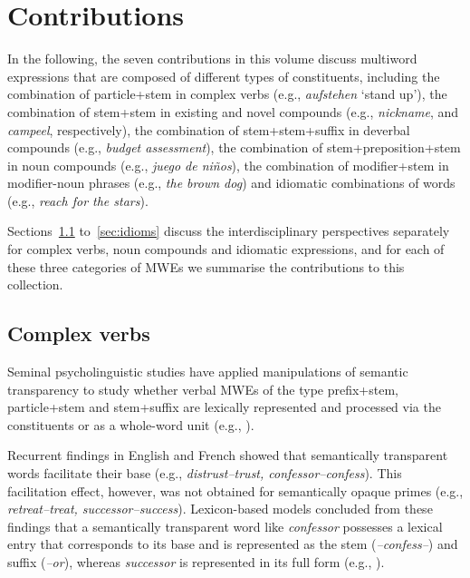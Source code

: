 \documentclass[output=paper]{langsci/langscibook}
\begin{document}
\section{Contributions}

In the following, the seven contributions in this volume discuss multiword expressions that are composed of different types of constituents, including the
combination of particle+stem in complex verbs (e.g., \textit{aufstehen} `stand up’), the combination of stem+stem in existing and novel compounds (e.g., \textit{nickname}, and \textit{campeel}, respectively), the combination of stem+stem+suffix in deverbal compounds (e.g., \textit{budget assessment}), the combination of stem+preposition+stem in noun compounds (e.g., \textit{juego de niños}), the combination of modifier+stem in modifier-noun phrases (e.g., \textit{the brown dog}) and idiomatic combinations of words (e.g., \textit{reach for the stars}).

Sections~\ref{sec:verbs} to~\ref{sec:idioms} discuss the
interdisciplinary perspectives separately for complex verbs, noun
compounds and idiomatic expressions, and for each of these three
categories of MWEs we summarise the contributions to this collection.


\subsection{Complex verbs}
\label{sec:verbs}

Seminal psycholinguistic studies have applied manipulations of
semantic transparency to study whether verbal MWEs of the type
prefix+stem, particle+stem and stem+suffix are lexically represented
and processed via the constituents or as a whole-word unit (e.g.,
\citealt{Taft/Forster:75, MarslenWilsonEtAl:94, LongtinEtAl:03}).

Recurrent findings in English and French showed that semantically
transparent words facilitate their base (e.g.,
\textit{distrust--trust, confessor--confess}). This facilitation
effect, however, was not obtained for semantically opaque primes
(e.g., \textit{retreat--treat, successor--success}). Lexicon-based
models concluded from these findings that a semantically transparent
word like \textit{confessor} possesses a lexical entry that
corresponds to its base and is represented as the stem
(\textit{--confess--}) and suffix (\textit{--or}), whereas
\textit{successor} is represented in its full form (e.g.,
\citealt{RastleEtAl:00, FeldmanEtAl:04, DiependaeleEtAl:05,
  Meunier/Longtin:07, MarslenWilsonEtAl:08, DiependaeleEtAl:09,
  Taft/NguyenHoan:10}).
\end{document}
